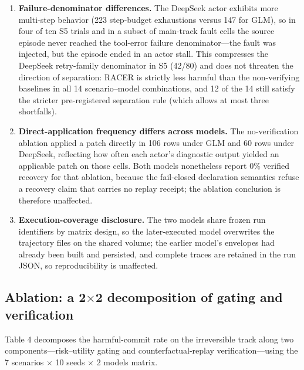 \documentclass[10pt]{article}
\begin{document}
\begin{enumerate}

  \item \textbf{Failure-denominator differences.} The DeepSeek actor exhibits more multi-step behavior (223 step-budget exhaustions versus 147 for GLM), so in four of ten S5 trials and in a subset of main-track fault cells the source episode never reached the tool-error failure denominator---the fault was injected, but the episode ended in an actor stall. This compresses the DeepSeek retry-family denominator in S5 (42/80) and does not threaten the direction of separation: RACER is strictly less harmful than the non-verifying baselines in all 14 scenario--model combinations, and 12 of the 14 still satisfy the stricter pre-registered separation rule (which allows at most three shortfalls).

  \item \textbf{Direct-application frequency differs across models.} The no-verification ablation applied a patch directly in 106 rows under GLM and 60 rows under DeepSeek, reflecting how often each actor's diagnostic output yielded an applicable patch on those cells. Both models nonetheless report 0\% verified recovery for that ablation, because the fail-closed declaration semantics refuse a recovery claim that carries no replay receipt; the ablation conclusion is therefore unaffected.

  \item \textbf{Execution-coverage disclosure.} The two models share frozen run identifiers by matrix design, so the later-executed model overwrites the trajectory files on the shared volume; the earlier model's envelopes had already been built and persisted, and complete traces are retained in the run JSON, so reproducibility is unaffected.

\end{enumerate}

\subsection{Ablation: a 2$\times$2 decomposition of gating and verification}

Table 4 decomposes the harmful-commit rate on the irreversible track along two components---risk--utility gating and counterfactual-replay verification---using the 7 scenarios $\times$ 10 seeds $\times$ 2 models matrix.
\end{document}
